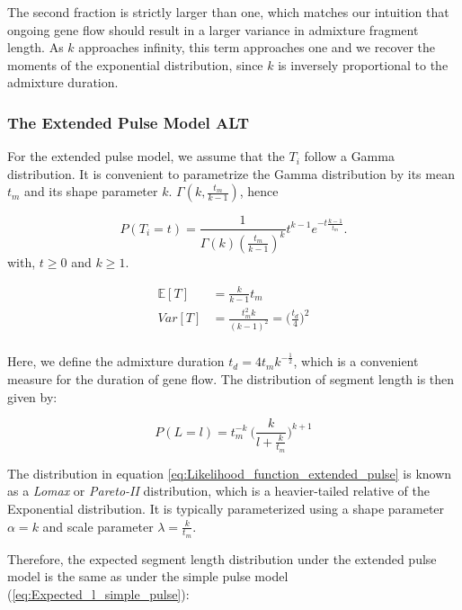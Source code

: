 \documentclass[]{article}
\begin{document}
The second fraction is strictly larger than one, which matches our intuition that ongoing gene flow should result in a larger variance in admixture fragment length. As $k$ approaches infinity, this term approaches one and we recover the moments of the exponential distribution, since $k$ is inversely proportional to the admixture duration.


\subsubsection{The Extended Pulse Model ALT}\label{The Extended Pulse Model}

For the extended pulse model, we assume that the $T_i$ follow a Gamma distribution. It is convenient to parametrize the Gamma distribution by its mean $t_m$ and its shape parameter $k$.  $\Gamma(k,\frac{t_m}{k-1})$, hence


\begin{equation}
\label{eq:RV_extended_pulse}
  P(T_i=t)=\frac{1}{\Gamma(k)(\frac{t_m}{k-1})^k}t^{k-1}e^{-t\frac{k-1}{t_m}}.
\end{equation} 
with, $t \geq 0$ and $k \geq 1$.

\begin{equation}
\begin{split}
\label{eq:RV_extended_pulse_properties}
\mathbb{E}[T]&=\frac{k}{k-1}t_{m} \\
Var[T]&=\frac{t_{m}^2 k }{(k-1)^2} = \bigg(\frac{t_d}{4} \bigg)^2  \\
\end{split}
\end{equation}

Here, we define the admixture duration $t_d=4t_m k^{-\frac{1}{2}} $, which is a convenient measure for the duration of gene flow. The distribution of segment length is then given by:


\begin{equation}
\label{eq:Likelihood_function_extended_pulse}
    P(L=l) = t_{m}^{-k} \ \Bigg( \frac{k}{l+\frac{k}{t_{m}}}\Bigg)^{k+1}
\end{equation}

The distribution  in equation \ref{eq:Likelihood_function_extended_pulse} is known as a \emph{Lomax} or \emph{Pareto-II} distribution, which is a heavier-tailed relative of the Exponential distribution. It is typically parameterized using a shape parameter $\alpha=k$ and scale parameter $\lambda = \frac{k}{t_m}$. 


Therefore, the expected segment length distribution under the extended pulse model is the same as under the simple pulse model (\ref{eq:Expected_l_simple_pulse}):
\end{document}
